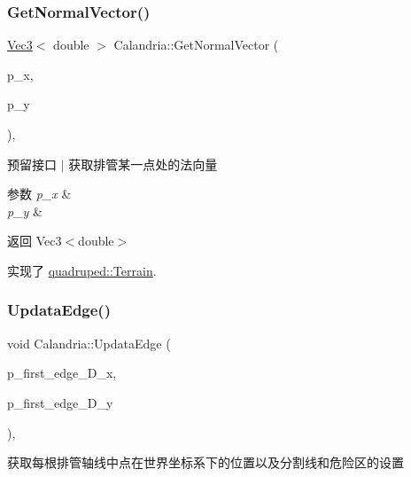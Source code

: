 \subsubsection{\texorpdfstring{Get\+Normal\+Vector()}{GetNormalVector()}}
{\footnotesize\ttfamily \hyperlink{cppTypes_8h_a65c27bf97693676535dd0b30ea0ad399}{Vec3}$<$ double $>$ Calandria\+::\+Get\+Normal\+Vector (\begin{DoxyParamCaption}\item[{double}]{p\+\_\+x,  }\item[{double}]{p\+\_\+y }\end{DoxyParamCaption})\hspace{0.3cm}{\ttfamily [override]}, {\ttfamily [virtual]}}



预留接口 $\vert$ 获取排管某一点处的法向量 


\begin{DoxyParams}{参数}
{\em p\+\_\+x} & \\
\hline
{\em p\+\_\+y} & \\
\hline
\end{DoxyParams}
\begin{DoxyReturn}{返回}
Vec3$<$double$>$ 
\end{DoxyReturn}


实现了 \hyperlink{classquadruped_1_1Terrain}{quadruped\+::\+Terrain}.

\mbox{\label{classquadruped_1_1Calandria_abb0128d7dc204f91a728f6bb3f5a92e4}} 
\subsubsection{\texorpdfstring{Updata\+Edge()}{UpdataEdge()}}
{\footnotesize\ttfamily void Calandria\+::\+Updata\+Edge (\begin{DoxyParamCaption}\item[{double}]{p\+\_\+first\+\_\+edge\+\_\+\+D\+\_\+x,  }\item[{double}]{p\+\_\+first\+\_\+edge\+\_\+\+D\+\_\+y }\end{DoxyParamCaption})\hspace{0.3cm}{\ttfamily [override]}, {\ttfamily [virtual]}}



获取每根排管轴线中点在世界坐标系下的位置以及分割线和危险区的设置 


